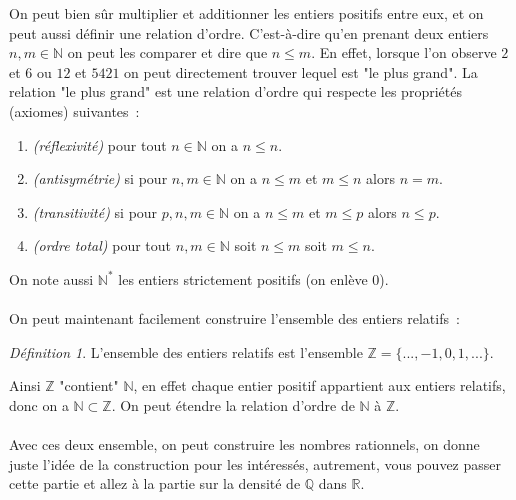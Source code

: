 \documentclass[oneside,12pt,french,table]{book}
\theoremstyle{definition}
\theoremstyle{plain}
\theoremstyle{remark}
\newtheorem{defi}[definition]{Définition}
\newcommand{\Nn}{{\mathbb{N}}}
\newcommand{\Zz}{{\mathbb{Z}}}
\newcommand{\Rr}{{\mathbb{R}}}
\newcommand{\Qq}{{\mathbb{Q}}}
\begin{document}
On peut bien sûr multiplier et additionner les entiers positifs entre eux, et on peut aussi définir une relation d'ordre. C'est-à-dire qu'en prenant deux entiers $n,m\in \Nn$ on peut les comparer et dire que $n\leq m $. En effet, lorsque l'on observe $2$ et $6$ ou $12$ et $5421$ on peut directement trouver lequel est "le plus grand". La relation "le plus grand" est une relation d'ordre qui respecte les propriétés (axiomes) suivantes : 
\begin{enumerate} [label=(\arabic*)]
    \item \textit{(réflexivité)} pour tout $ n\in \Nn$ on a $n\leq n$.
    \item \textit{(antisymétrie)} si pour $n,m\in \Nn$ on a $n\leq m$ et $m\leq n$ alors $n=m$.
    \item \textit{(transitivité)} si pour $p,n,m \in \Nn$ on a $n\leq m$ et $m\leq p$ alors $n\leq p$.
    \item \textit{(ordre total)} pour tout $n,m\in \Nn$ soit $n\leq m$ soit $m\leq n$.
\end{enumerate}
On note aussi $\Nn^*$ les entiers strictement positifs (on enlève 0).\\\\
On peut maintenant facilement construire l'ensemble des entiers relatifs : 
\begin{defi}
    L'ensemble des entiers relatifs est l'ensemble $\Zz=\{...,-1,0,1,...\}$.
\end{defi}
Ainsi $\Zz$ "contient" $\Nn$, en effet chaque entier positif appartient aux entiers relatifs, donc on a $\Nn \subset \Zz$. On peut étendre la relation d'ordre de $\Nn$ à $\Zz$.\\\\
Avec ces deux ensemble, on peut construire les nombres rationnels, on donne juste l'idée de la construction pour les intéressés, autrement, vous pouvez passer cette partie et allez à la partie sur la densité de $\Qq$ dans $\Rr$.
\end{document}
